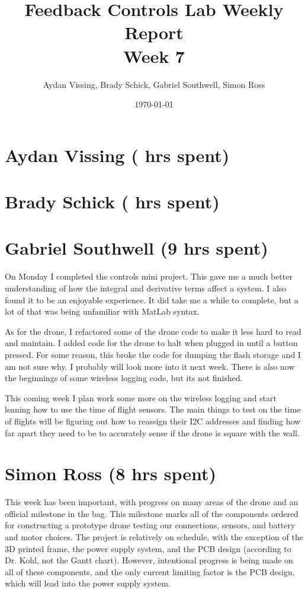 \documentclass[12pt, titlepage]{article}
\title{Feedback Controls Lab Weekly Report \\ \normalsize{Week 7}}
\author{Aydan Vissing, Brady Schick, Gabriel Southwell, Simon Ross}
\date{\today}
\begin{document}
\maketitle

\section*{Aydan Vissing ( hrs spent)}



\section*{Brady Schick ( hrs spent)}



\section*{Gabriel Southwell (9 hrs spent)}

On Monday I completed the controls mini project. This gave me a much better understanding of how the integral and derivative terms affect a system. I also found it to be an enjoyable experience. It did take me a while to complete, but a lot of that was being unfamiliar with MatLab syntax.

As for the drone, I refactored some of the drone code to make it less hard to read and maintain. I added code for the drone to halt when plugged in until a button pressed. For some reason, this broke the code for dumping the flash storage and I am not sure why. I probably will look more into it next week. There is also now the beginnings of some wireless logging code, but its not finished.

This coming week I plan work some more on the wireless logging and start leaning how to use the time of flight sensors. The main things to test on the time of flights will be figuring out how to reassign their I2C addresses and finding how far apart they need to be to accurately sense if the drone is square with the wall.   


\section*{Simon Ross (8 hrs spent)}

This week has been important, with progress on many areas of the drone and an official milestone in the bag. This milestone marks all of the components ordered for constructing a prototype drone testing our connections, sensors, and battery and motor choices. The project is relatively on schedule, with the exception of the 3D printed frame, the power supply system, and the PCB design (according to Dr. Kohl, not the Gantt chart). However, intentional progress is being made on all of these components, and the only current limiting factor is the PCB design, which will lead into the power supply system.
\end{document}
